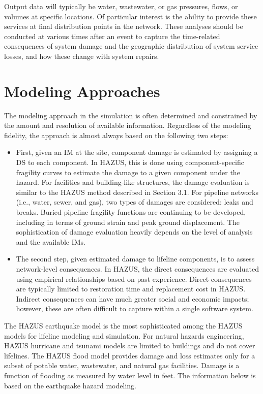 Output data will typically be water, wastewater, or gas pressures, flows, or volumes at specific locations. Of particular interest is the ability to provide these services at final distribution points in the network. These analyses should be conducted at various times after an event to capture the time-related consequences of system damage and the geographic distribution of system service losses, and how these change with system repairs.

\section{Modeling Approaches}
\label{sec:perf_pipeline_methods}

The modeling approach in the simulation is often determined and constrained by the amount and resolution of available information. Regardless of the modeling fidelity, the approach is almost always based on the following two steps: 

\begin{itemize}
    \item First, given an IM at the site, component damage is estimated by assigning a DS to each component. In HAZUS, this is done using component-specific fragility curves to estimate the damage to a given component under the hazard. For facilities and building-like structures, the damage evaluation is similar to the HAZUS method described in Section 3.1. For pipeline networks (i.e., water, sewer, and gas), two types of damages are considered: leaks and breaks. Buried pipeline fragility functions are continuing to be developed, including in terms of ground strain and peak ground displacement. The sophistication of damage evaluation heavily depends on the level of analysis and the available IMs. 
    \item The second step, given estimated damage to lifeline components, is to assess network-level consequences. In HAZUS, the direct consequences are evaluated using empirical relationships based on past experience. Direct consequences are typically limited to restoration time and replacement cost in HAZUS. Indirect consequences can have much greater social and economic impacts; however, these are often difficult to capture within a single software system.
\end{itemize}

The HAZUS earthquake model is the most sophisticated among the HAZUS models for lifeline modeling and simulation. For natural hazards engineering, HAZUS hurricane and tsunami models are limited to buildings and do not cover lifelines. The HAZUS flood model provides damage and loss estimates only for a subset of potable water, wastewater, and natural gas facilities. Damage is a function of flooding as measured by water level in feet. The information below is based on the earthquake hazard modeling.

